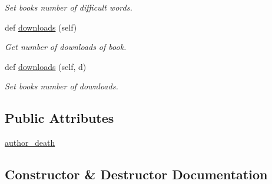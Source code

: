 \begin{DoxyCompactItemize}
\begin{DoxyCompactList}\small\item\em Set book\textquotesingle{}s number of difficult words. \end{DoxyCompactList}\item 
def \hyperlink{classbridges_1_1data__src__dependent_1_1gutenberg__book_1_1_gutenberg_book_afb28a5f09f09aea1397d32bf075d847a}{downloads} (self)
\begin{DoxyCompactList}\small\item\em Get number of downloads of book. \end{DoxyCompactList}\item 
def \hyperlink{classbridges_1_1data__src__dependent_1_1gutenberg__book_1_1_gutenberg_book_a5fe07e62aae174ef3c862f3f5ad7f6e6}{downloads} (self, d)
\begin{DoxyCompactList}\small\item\em Set book\textquotesingle{}s number of downloads. \end{DoxyCompactList}\end{DoxyCompactItemize}
\subsection*{Public Attributes}
\begin{DoxyCompactItemize}
\item 
\hyperlink{classbridges_1_1data__src__dependent_1_1gutenberg__book_1_1_gutenberg_book_afd78a02948accf9b270e7b9cb9e38856}{author\+\_\+death}
\end{DoxyCompactItemize}


\subsection{Constructor \& Destructor Documentation}
\mbox{\label{classbridges_1_1data__src__dependent_1_1gutenberg__book_1_1_gutenberg_book_ac44f922d6f63fc6ab3c0788ea9b9c4b5}} 
